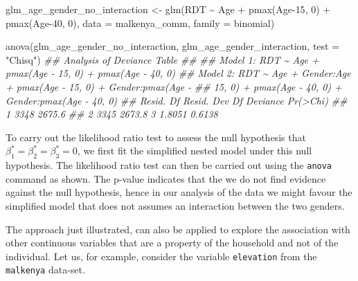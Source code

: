 \documentclass[
  letterpaper,
]{krantz}
\newenvironment{Shaded}{\begin{snugshade}}{\end{snugshade}}
\newcommand{\AttributeTok}[1]{\textcolor[rgb]{0.40,0.45,0.13}{#1}}
\newcommand{\ConstantTok}[1]{\textcolor[rgb]{0.56,0.35,0.01}{#1}}
\newcommand{\DecValTok}[1]{\textcolor[rgb]{0.68,0.00,0.00}{#1}}
\newcommand{\DocumentationTok}[1]{\textcolor[rgb]{0.37,0.37,0.37}{\textit{#1}}}
\newcommand{\FloatTok}[1]{\textcolor[rgb]{0.68,0.00,0.00}{#1}}
\newcommand{\FunctionTok}[1]{\textcolor[rgb]{0.28,0.35,0.67}{#1}}
\newcommand{\NormalTok}[1]{\textcolor[rgb]{0.00,0.23,0.31}{#1}}
\newcommand{\OtherTok}[1]{\textcolor[rgb]{0.00,0.23,0.31}{#1}}
\newcommand{\SpecialCharTok}[1]{\textcolor[rgb]{0.37,0.37,0.37}{#1}}
\newcommand{\StringTok}[1]{\textcolor[rgb]{0.13,0.47,0.30}{#1}}
\begin{document}
\begin{Shaded}
\begin{Highlighting}[]
\NormalTok{glm\_age\_gender\_no\_interaction }\OtherTok{\textless{}{-}} \FunctionTok{glm}\NormalTok{(RDT }\SpecialCharTok{\textasciitilde{}}\NormalTok{ Age }\SpecialCharTok{+}  \FunctionTok{pmax}\NormalTok{(Age}\DecValTok{{-}15}\NormalTok{, }\DecValTok{0}\NormalTok{) }\SpecialCharTok{+} \FunctionTok{pmax}\NormalTok{(Age}\DecValTok{{-}40}\NormalTok{, }\DecValTok{0}\NormalTok{),}
                              \AttributeTok{data =}\NormalTok{ malkenya\_comm, }\AttributeTok{family =}\NormalTok{ binomial)}

\FunctionTok{anova}\NormalTok{(glm\_age\_gender\_no\_interaction, glm\_age\_gender\_interaction, }\AttributeTok{test =} \StringTok{"Chisq"}\NormalTok{)}
\DocumentationTok{\#\# Analysis of Deviance Table}
\DocumentationTok{\#\# }
\DocumentationTok{\#\# Model 1: RDT \textasciitilde{} Age + pmax(Age {-} 15, 0) + pmax(Age {-} 40, 0)}
\DocumentationTok{\#\# Model 2: RDT \textasciitilde{} Age + Gender:Age + pmax(Age {-} 15, 0) + Gender:pmax(Age {-} }
\DocumentationTok{\#\#     15, 0) + pmax(Age {-} 40, 0) + Gender:pmax(Age {-} 40, 0)}
\DocumentationTok{\#\#   Resid. Df Resid. Dev Df Deviance Pr(\textgreater{}Chi)}
\DocumentationTok{\#\# 1      3348     2675.6                     }
\DocumentationTok{\#\# 2      3345     2673.8  3   1.8051   0.6138}
\end{Highlighting}
\end{Shaded}

To carry out the likelihood ratio test to assess the null hypothesis
that \(\beta_{1}^*=\beta_{2}^*=\beta_{3}^*=0\), we first fit the
simplified nested model under this null hypothesis. The likelihood ratio
test can then be carried out using the \texttt{anova} command as shown.
The p-value indicates that the we do not find evidence against the null
hypothesis, hence in our analysis of the data we might favour the
simplified model that does not assumes an interaction between the two
genders.

The approach just illustrated, can also be applied to explore the
association with other continuous variables that are a property of the
household and not of the individual. Let us, for example, consider the
variable \texttt{elevation} from the \texttt{malkenya} data-set.

\begin{Shaded}
\end{Shaded}
\end{document}
